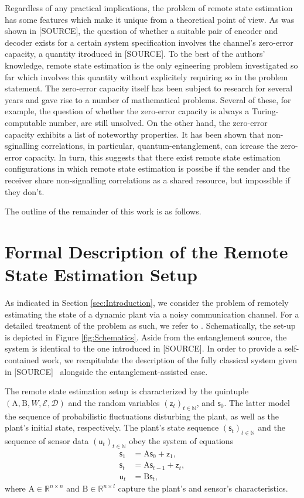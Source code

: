 \documentclass[conference]{IEEEtran}
\newcommand{\rs}{\mathsf{s}}
\newcommand{\rz}{\mathsf{z}}
\newcommand{\ru}{\mathsf{u}}
\def\E{{\mathcal E}}
\def\D{{\mathcal D}}
\def\NN{{\mathbb N}}
\def\RR{{\mathbb R}}
\def\mA{\bm{\mathrm{A}}}
\def\mB{\bm{\mathrm{B}}}
\newcommand{\sdummy}{{\color{red}[SOURCE]}}
\begin{document}
	Regardless of any practical implications, the problem of remote state estimation has some features which make it unique from a theoretical point of view. As was shown in \sdummy, 
	the question of whether a suitable pair of encoder and decoder exists for a certain system specification involves the channel's zero-error capacity, a quantity itroduced in \sdummy. 
	To the best of the authors' knowledge, remote state estimation is the only egineering problem investigated so far which involves this quantity without explicitely requiring so in the 
	problem statement. The zero-error capacity itself has been subject to research for several years and gave rise to a number of mathematical problems. Several of these, for example, 
	the question of whether the zero-error capacity is always a Turing-computable number, are still unsolved. On the other hand, the zero-error capacity exhibits a list of noteworthy properties. 
	It has been shown that non-sginalling correlations, in particular, quantum-entanglement, can icrease the zero-error capacity. In turn, this suggests that there exist remote state estimation 
	configurations in which remote state estimation is possibe if the sender and the receiver share non-signalling correlations as a shared resource, but impossible if they don't. 

	The outline of the remainder of this work is as follows.

\section{Formal Description of the Remote State Estimation Setup}
	\noindent As indicated in Section \ref{sec:Introduction}, we consider the problem of remotely estimating the state of a dynamic plant via a noisy communication channel. 
	For a detailed treatment of the problem as such, we refer to \cite{MS07}. Schematically, the set-up is depicted in Figure \ref{fig:Schematics}. Aside from the entanglement source, 
	the system is identical to the one introduced in \sdummy. In order to provide a self-contained work, we recapitulate the description of the fully classical system given in \sdummy~ 
	alongside the entanglement-assisted case.

	The remote state estimation setup is characterized by the quintuple \((\mA,\mB,W,\E,\D)\) and the random variables \((\rz_t)_{t\in\NN}\), and \(\rs_{0}\). 
	The latter model the sequence of probabilistic fluctuations disturbing the plant, as well as the plant's initial state, respectively. The plant's state sequence \((\rs_t)_{t\in\NN}\) 
	and the sequence of sensor data \((\ru_t)_{t\in\NN}\) obey the system of equations
	\begin{align}	\rs_1    &= \mA \rs_0 + \rz_1, \\ 
					\rs_t    &= \mA \rs_{t-1} + \rz_t,\\ 
					\ru_t    &= \mB \rs_t,
	\end{align}
	where \(\mA\in\RR^{n\times n}\) and \(\mB\in\RR^{n\times l}\) capture the plant's and sensor's characteristics. 
\end{document}
